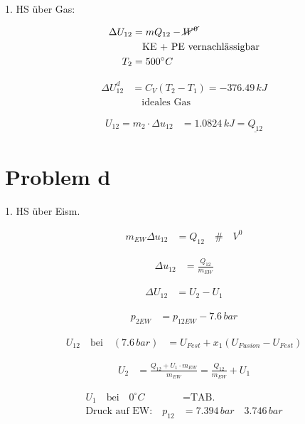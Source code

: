 1. HS über Gas: \quad {}

\begin{align*}
    \Delta U_{12} &= m Q_{12} - \cancel{W^0} \\
    & \quad \text{KE + PE vernachlässigbar} \\
    T_2 &= 500^\circ C
\end{align*}

\begin{align*}
    \Delta U_{12}^d &= C_V (T_2 - T_1) = -376.49 \, kJ \\
    & \quad \text{ideales Gas}
\end{align*}

\begin{align*}
    U_{12} = m_2 \cdot \Delta u_{12} &= 1.0824 \, kJ = \underline{Q_{12}}
\end{align*}

\section*{Problem d}

1. HS über Eism. \quad {}

\begin{align*}
    m_{EW} \Delta u_{12} &= Q_{12} \quad \# \quad V^0
\end{align*}

\begin{align*}
    \Delta u_{12} &= \frac{Q_{12}}{m_{EW}}
\end{align*}

\begin{align*}
    \Delta U_{12} &= U_2 - U_1
\end{align*}

\begin{align*}
    p_{2EW} &= p_{12EW} - 7.6 \, bar
\end{align*}

\begin{align*}
    U_{12} \quad \text{bei} \quad (7.6 \, bar) &= U_{Fest} + x_1 (U_{Fusion} - U_{Fest})
\end{align*}

\begin{align*}
    U_2 &= \frac{Q_{12} + U_1 \cdot m_{EW}}{m_{EW}} = \frac{Q_{12}}{m_{EW}} + U_1
\end{align*}

\begin{align*}
    U_1 \quad \text{bei} \quad 0^\circ C &= \text{TAB.} \\
    \text{Druck auf EW:} \quad p_{12} &= 7.394 \, bar \quad 3.746 \, bar
\end{align*}

